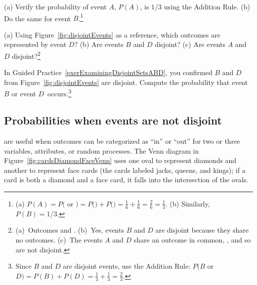 \begin{exercise}
(a) Verify the probability of event $A$, $P(A)$, is $1/3$ using the Addition Rule. (b) Do the same for event $B$.\footnote{(a) $P(A) = P($ or $) = P($$) + P($$) = \frac{1}{6} + \frac{1}{6} = \frac{2}{6} = \frac{1}{3}$. (b) Similarly, $P(B) = 1/3$.}
\end{exercise}

\begin{exercise} \label{exerExaminingDisjointSetsABD}
(a) Using Figure~\ref{fig:disjointEvents} as a reference, which outcomes are represented by event $D$? (b) Are events $B$ and $D$ disjoint? (c) Are events $A$ and $D$ disjoint?\footnote{(a)~Outcomes  and . (b)~Yes, events $B$ and $D$ are disjoint because they share no outcomes. (c)~The events $A$ and $D$ share an outcome in common, , and so are not disjoint.}
\end{exercise}

\begin{exercise}
In Guided Practice~\ref{exerExaminingDisjointSetsABD}, you confirmed $B$ and $D$ from Figure~\ref{fig:disjointEvents} are disjoint. Compute the probability that event $B$ or event $D$~occurs.\footnote{Since $B$ and $D$ are disjoint events, use the Addition Rule: $P(B$ or $D) = P(B) + P(D) = \frac{1}{3} + \frac{1}{3} = \frac{2}{3}$.}
\end{exercise}



\subsection{Probabilities when events are not disjoint}

 are useful when outcomes can be categorized as ``in'' or ``out'' for two or three variables, attributes, or random processes. The Venn diagram in Figure~\ref{fig:cardsDiamondFaceVenn} uses one oval to represent diamonds and another to represent face cards (the cards labeled jacks, queens, and kings); if a card is both a diamond and a face card, it falls into the intersection of the ovals.


